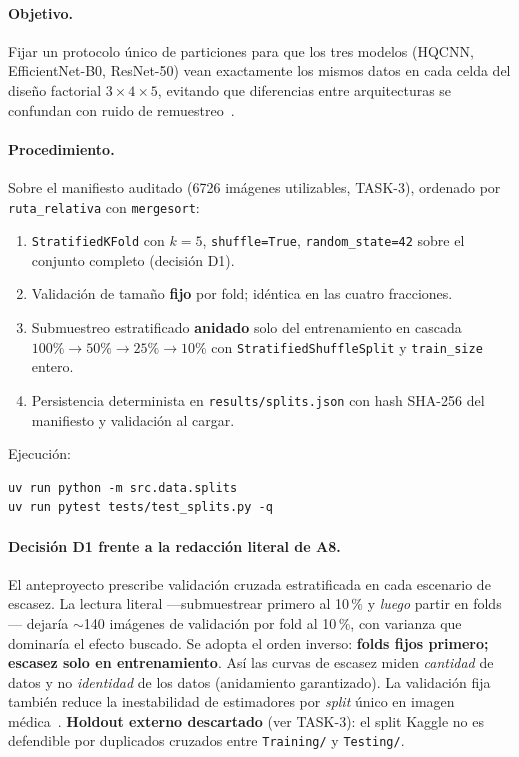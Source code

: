 \paragraph{Objetivo.}
Fijar un protocolo único de particiones para que los tres modelos (HQCNN, EfficientNet-B0,
ResNet-50) vean exactamente los mismos datos en cada celda del diseño factorial
$3 \times 4 \times 5$, evitando que diferencias entre arquitecturas se confundan con ruido
de remuestreo~\cite{caro2022generalization,gupta2025systematic,khan2024brain}.

\paragraph{Procedimiento.}
Sobre el manifiesto auditado (6726 imágenes utilizables, TASK-3), ordenado por
\texttt{ruta\_relativa} con \texttt{mergesort}:
\begin{enumerate}
  \item \texttt{StratifiedKFold} con $k=5$, \texttt{shuffle=True}, \texttt{random\_state=42}
        sobre el conjunto completo (decisión D1).
  \item Validación de tamaño \textbf{fijo} por fold; idéntica en las cuatro fracciones.
  \item Submuestreo estratificado \textbf{anidado} solo del entrenamiento en cascada
        $100\% \rightarrow 50\% \rightarrow 25\% \rightarrow 10\%$ con
        \texttt{StratifiedShuffleSplit} y \texttt{train\_size} entero.
  \item Persistencia determinista en \texttt{results/splits.json} con hash SHA-256 del
        manifiesto y validación al cargar.
\end{enumerate}
Ejecución:
\begin{verbatim}
uv run python -m src.data.splits
uv run pytest tests/test_splits.py -q
\end{verbatim}

\paragraph{Decisión D1 frente a la redacción literal de A8.}
El anteproyecto prescribe validación cruzada estratificada en cada escenario de escasez.
La lectura literal ---submuestrear primero al 10\,\% y \emph{luego} partir en folds---
dejaría $\sim$140 imágenes de validación por fold al 10\,\%, con varianza que dominaría
el efecto buscado. Se adopta el orden inverso: \textbf{folds fijos primero; escasez solo
en entrenamiento}. Así las curvas de escasez miden \emph{cantidad} de datos y no
\emph{identidad} de los datos (anidamiento garantizado). La validación fija también
reduce la inestabilidad de estimadores por \textit{split} único en imagen médica~\cite{li2021cvstability}.
\textbf{Holdout externo descartado} (ver TASK-3): el split Kaggle no es defendible por
duplicados cruzados entre \texttt{Training/} y \texttt{Testing/}.

